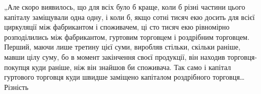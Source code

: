 „Але скоро виявилось, що для всіх було б краще, коли б різні частини
цього капіталу заміщували одна одну, і коли б, якщо сотні тисяч екю
досить для всієї циркуляції між фабрикантом і споживачем, ці сто тисяч
екю рівномірно розподілились між фабрикантом, гуртовим торговцем і
роздрібним торговцем. Перший, маючи лише третину цієї суми, виробляв
стільки, скільки раніше, мавши цілу суму, бо в момент закінчення
своєї продукції, він находив торговця-покупця куди раніше, ніж
він знайшов би споживача. Так само і капітал гуртового торговця
куди швидше заміщено капіталом роздрібного торговця\dots{} Різність
\parbreak{}  %
